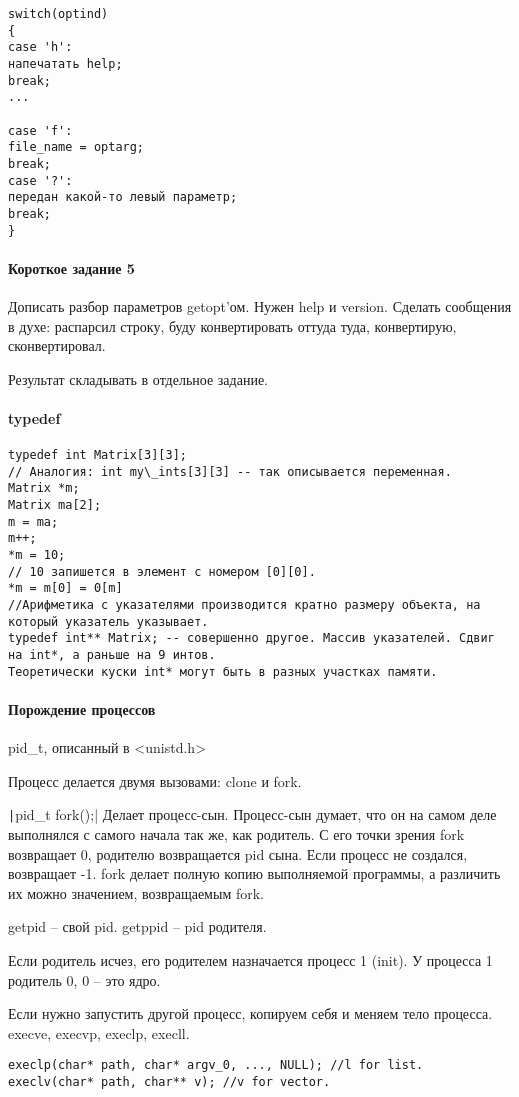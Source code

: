 \documentclass[a4paper,10pt]{article}
\newcommand{\ci}{\texttt}
\begin{document}
\begin{verbatim}
switch(optind)
{
case 'h':
напечатать help;
break;
...

case 'f':
file_name = optarg;
break;
case '?':
передан какой-то левый параметр;
break;
}
\end{verbatim}
\paragraph{Короткое задание 5}
Дописать разбор параметров getopt'ом. Нужен help и version. Сделать сообщения в духе: распарсил строку, буду конвертировать оттуда туда, конвертирую, сконвертировал.

Результат складывать в отдельное задание.
\paragraph{typedef}
\begin{verbatim}
typedef int Matrix[3][3];
// Аналогия: int my\_ints[3][3] -- так описывается переменная.
Matrix *m;
Matrix ma[2];
m = ma;
m++;
*m = 10;
// 10 запишется в элемент с номером [0][0].
*m = m[0] = 0[m]
//Арифметика с указателями производится кратно размеру объекта, на который указатель указывает.
typedef int** Matrix; -- совершенно другое. Массив указателей. Сдвиг на int*, а раньше на 9 интов.
Теоретически куски int* могут быть в разных участках памяти.
\end{verbatim}
\paragraph{Порождение процессов}
pid\_t, описанный в <unistd.h>

Процесс делается двумя вызовами: clone и fork.

\ci|pid_t fork();|
Делает процесс-сын. Процесс-сын думает, что он на самом деле выполнялся с самого начала так же, как родитель. С его точки зрения fork возвращает 0, родителю возвращается pid сына. Если процесс не создался, возвращает -1.
fork делает полную копию выполняемой программы, а различить их можно значением, возвращаемым fork.

getpid -- свой pid. getppid -- pid родителя.

Если родитель исчез, его родителем назначается процесс 1 (init). У процесса 1 родитель 0, 0 -- это ядро.

Если нужно запустить другой процесс, копируем себя и меняем тело процесса.
execve, execvp, execlp, execll.

\begin{verbatim}
execlp(char* path, char* argv_0, ..., NULL); //l for list.
execlv(char* path, char** v); //v for vector.
\end{verbatim}
\end{document}
